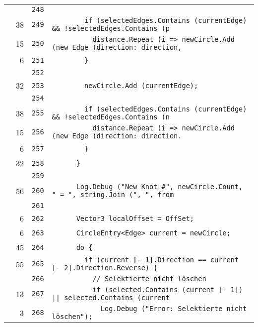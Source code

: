 \documentclass[a4paper,10pt]{article}
\begin{document}
\begin{longtable}[l]{lrrl}
\cellcolor{gray} &  & \verb~248~ & \verb~~\\
\cellcolor{green} & 38 & \verb~249~ & \verb~        if (selectedEdges.Contains (currentEdge) && !selectedEdges.Contains (p~\\
\cellcolor{green} & 15 & \verb~250~ & \verb~          distance.Repeat (i => newCircle.Add (new Edge (direction: direction,~\\
\cellcolor{green} & 6 & \verb~251~ & \verb~        }~\\
\cellcolor{gray} &  & \verb~252~ & \verb~~\\
\cellcolor{green} & 32 & \verb~253~ & \verb~        newCircle.Add (currentEdge);~\\
\cellcolor{gray} &  & \verb~254~ & \verb~~\\
\cellcolor{green} & 38 & \verb~255~ & \verb~        if (selectedEdges.Contains (currentEdge) && !selectedEdges.Contains (n~\\
\cellcolor{green} & 15 & \verb~256~ & \verb~          distance.Repeat (i => newCircle.Add (new Edge (direction: direction.~\\
\cellcolor{green} & 6 & \verb~257~ & \verb~        }~\\
\cellcolor{green} & 32 & \verb~258~ & \verb~      }~\\
\cellcolor{gray} &  & \verb~259~ & \verb~~\\
\cellcolor{green} & 56 & \verb~260~ & \verb~      Log.Debug ("New Knot #", newCircle.Count, " = ", string.Join (", ", from~\\
\cellcolor{gray} &  & \verb~261~ & \verb~~\\
\cellcolor{green} & 6 & \verb~262~ & \verb~      Vector3 localOffset = OffSet;~\\
\cellcolor{green} & 6 & \verb~263~ & \verb~      CircleEntry<Edge> current = newCircle;~\\
\cellcolor{green} & 45 & \verb~264~ & \verb~      do {~\\
\cellcolor{green} & 55 & \verb~265~ & \verb~        if (current [- 1].Direction == current [- 2].Direction.Reverse) {~\\
\cellcolor{gray} &  & \verb~266~ & \verb~          // Selektierte nicht löschen~\\
\cellcolor{green} & 13 & \verb~267~ & \verb~          if (selected.Contains (current [- 1]) || selected.Contains (current ~\\
\cellcolor{green} & 3 & \verb~268~ & \verb~            Log.Debug ("Error: Selektierte nicht löschen");~\\

\end{longtable}
\end{document}
